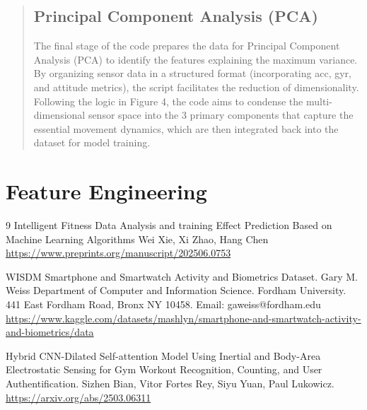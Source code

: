 \documentclass[11pt,a4paper]{article}
\begin{document}
\begin{quote}
\subsection{Principal Component Analysis (PCA)}
The final stage of the code prepares the data for Principal Component Analysis (PCA) to identify the features explaining the maximum variance. By organizing sensor data in a structured format (incorporating acc, gyr, and attitude metrics), the script facilitates the reduction of dimensionality. Following the logic in Figure 4, the code aims to condense the multi-dimensional sensor space into the 3 primary components that capture the essential movement dynamics, which are then integrated back into the dataset for model training.




\end{quote}

\section{Feature Engineering}


\begin{thebibliography}{9}
Intelligent Fitness Data Analysis and training Effect Prediction Based on Machine Learning Algorithms Wei Xie, Xi Zhao, Hang Chen
\url{https://www.preprints.org/manuscript/202506.0753}

WISDM Smartphone and Smartwatch Activity and Biometrics Dataset. Gary M. Weiss Department of Computer and Information Science. Fordham University. 441 East Fordham Road, Bronx NY 10458. Email: gaweiss@fordham.edu
\url{https://www.kaggle.com/datasets/mashlyn/smartphone-and-smartwatch-activity-and-biometrics/data}

Hybrid CNN-Dilated Self-attention Model Using Inertial and Body-Area Electrostatic Sensing for Gym Workout Recognition, Counting, and User Authentification. Sizhen Bian, Vitor Fortes Rey, Siyu Yuan, Paul Lukowicz.
\url{https://arxiv.org/abs/2503.06311}

\end{thebibliography}
\end{document}
